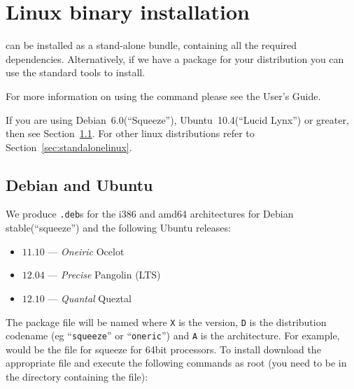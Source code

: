 %
%
%

\section{Linux binary installation}
\label{sec:binlinux}

\esfinley can be installed as a stand-alone bundle, containing all the required dependencies.
Alternatively, if we have a package for your distribution you can use the standard tools to install.


For more information on using the  command please see the User's Guide.

If you are using Debian~6.0(``Squeeze''), Ubuntu~10.4(``Lucid Lynx'') or greater, then see Section~\ref{sec:debian}.
For other linux distributions refer to Section~\ref{sec:standalonelinux}.

\subsection{Debian and Ubuntu}\label{sec:debian}

We produce \texttt{.deb}s for the i386 and amd64 architectures for Debian stable(``squeeze'') and the 
following Ubuntu releases:
\begin{itemize}
 \item $11.10$ --- \emph{Oneiric} Ocelot
 \item $12.04$ --- \emph{Precise} Pangolin (LTS)
 \item $12.10$ --- \emph{Quantal} Queztal 
\end{itemize}

The package file will be named  where \texttt{X} is the version, \texttt{D} 
is the distribution codename (eg ``\texttt{squeeze}'' or ``\texttt{oneric}'') and \texttt{A} is the architecture.
For example,  would be the file for squeeze for 64bit processors.
To install \esfinley download the appropriate  file and execute the following 
commands as root (you need to be in the directory containing the file):

